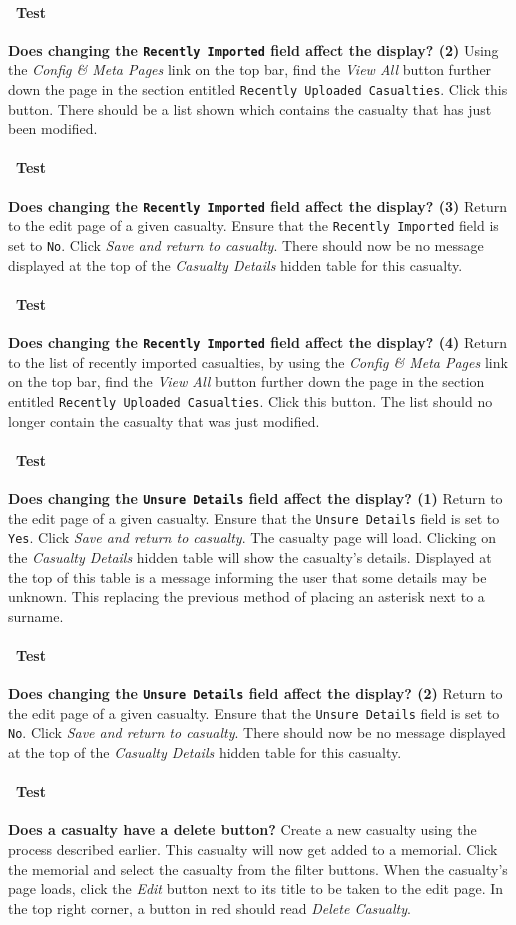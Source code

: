 \documentclass[12pt]{article}
\newcounter{Test}
\newcommand{\test}[1]{%
\stepcounter{Test}%
\paragraph{\Circle\ Test \theTest} \textbf{#1} }
\begin{document}
\test{Does changing the \texttt{Recently Imported} field affect the display? (2)}
Using the \textit{Config \& Meta Pages} link on the top bar, find the \textit{View All} button further down the page in the section entitled \texttt{Recently Uploaded Casualties}. Click this button. There should be a list shown which contains the casualty that has just been modified.

\test{Does changing the \texttt{Recently Imported} field affect the display? (3)}
Return to the edit page of a given casualty. Ensure that the \texttt{Recently Imported} field is set to \texttt{No}. Click \textit{Save and return to casualty}. There should now be no message displayed at the top of the  \textit{Casualty Details} hidden table for this casualty.

\test{Does changing the \texttt{Recently Imported} field affect the display? (4)}
Return to the list of recently imported casualties, by using the \textit{Config \& Meta Pages} link on the top bar, find the \textit{View All} button further down the page in the section entitled \texttt{Recently Uploaded Casualties}. Click this button. The list should no longer contain the casualty that was just modified.

\test{Does changing the \texttt{Unsure Details} field affect the display? (1)}
Return to the edit page of a given casualty. Ensure that the \texttt{Unsure Details} field is set to \texttt{Yes}. Click \textit{Save and return to casualty}. The casualty page will load. Clicking on the \textit{Casualty Details} hidden table will show the casualty's details. Displayed at the top of this table is a message informing the user that some details may be unknown. This replacing the previous method of placing an asterisk next to a surname.

\test{Does changing the \texttt{Unsure Details} field affect the display? (2)}
Return to the edit page of a given casualty. Ensure that the \texttt{Unsure Details} field is set to \texttt{No}. Click \textit{Save and return to casualty}. There should now be no message displayed at the top of the \textit{Casualty Details} hidden table for this casualty.

\test{Does a casualty have a delete button?}
Create a new casualty using the process described earlier. This casualty will now get added to a memorial. Click the memorial and select the casualty from the filter buttons. When the casualty's page loads, click the \textit{Edit} button next to its title to be taken to the edit page. In the top right corner, a button in red should read \textit{Delete Casualty}.
\end{document}
